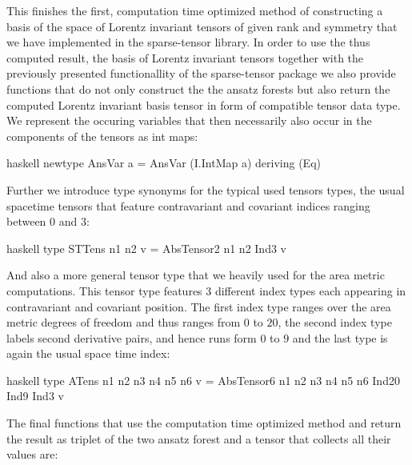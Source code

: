 \documentclass[a4paper,12pt, DIV=14, BCOR=5mm, twoside, headsepline]{scrbook}
\begin{document}
This finishes the first, computation time optimized method of constructing a basis of the space of Lorentz invariant tensors of given rank and symmetry that we have implemented in the sparse-tensor library. In order to use the thus computed result, the basis of Lorentz invariant tensors together with the previously presented functionallity of the sparse-tensor package we also provide functions that do not only construct the the ansatz forests but also return the computed Lorentz invariant basis tensor in form of compatible tensor data type. We represent the occuring variables that then necessarily also occur in the components of the tensors as int maps:
\begin{center}
\begin{cminted}{haskell}
newtype AnsVar a = AnsVar (I.IntMap a) deriving (Eq)
\end{cminted}
\end{center}

Further we introduce type synonyms for the typical used tensors types, the usual spacetime tensors that feature contravariant and covariant indices ranging between $0$ and $3$:

\begin{center}
\begin{cminted}{haskell}
type STTens n1 n2 v = AbsTensor2 n1 n2 Ind3 v
\end{cminted}
\end{center}

And also a more general tensor type that we heavily used for the area metric computations. This tensor type features 3 different index types each appearing in contravariant and covariant position. The first index type ranges over the area metric degrees of freedom and thus ranges from $0$ to $20$, the second index type labels second derivative pairs, and hence runs form $0$ to $9$ and the last type is again the usual space time index:

\begin{center}
\begin{cminted}{haskell}
type ATens n1 n2 n3 n4 n5 n6 v = 
     AbsTensor6 n1 n2 n3 n4 n5 n6 Ind20 Ind9 Ind3 v
\end{cminted}
\end{center}

The final functions that use the computation time optimized method and return the result as triplet of the two ansatz forest and a tensor that collects all their values are:
\end{document}
